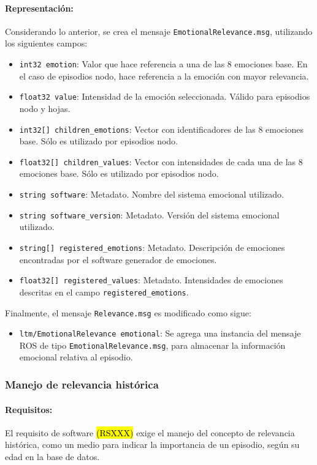 \paragraph{Representación:}
Considerando lo anterior, se crea el mensaje \texttt{EmotionalRelevance.msg}, utilizando los siguientes campos:
\begin{itemize}
\item \texttt{int32 emotion}: Valor que hace referencia a una de las 8 emociones base. En el caso de episodios nodo, hace referencia a la emoción con mayor relevancia.
\item \texttt{float32 value}: Intensidad de la emoción seleccionada. Válido para episodios nodo y hojas.
\item \texttt{int32[] children\_emotions}: Vector con identificadores de las 8 emociones base. Sólo es utilizado por episodios nodo.
\item \texttt{float32[] children\_values}: Vector con intensidades de cada una de las 8 emociones base. Sólo es utilizado por episodios nodo.
\item \texttt{string software}: Metadato. Nombre del sistema emocional utilizado.
\item \texttt{string software\_version}: Metadato. Versión del sistema emocional utilizado.
\item \texttt{string[] registered\_emotions}: Metadato. Descripción de emociones encontradas por el software generador de emociones. 
\item \texttt{float32[] registered\_values}: Metadato. Intensidades de emociones descritas en el campo \texttt{registered\_emotions}.
\end{itemize}


Finalmente, el mensaje \texttt{Relevance.msg} es modificado como sigue:
\begin{itemize}
	\item \texttt{ltm/EmotionalRelevance emotional}: Se agrega una instancia del mensaje ROS de tipo \texttt{EmotionalRelevance.msg}, para almacenar la información emocional relativa al episodio.
\end{itemize}


\subsubsection{Manejo de relevancia histórica}

\paragraph{Requisitos:}
El requisito de software \hl{(RSXXX)} exige el manejo del concepto de relevancia histórica, como un medio para indicar la importancia de un episodio, según su edad en la base de datos. 

